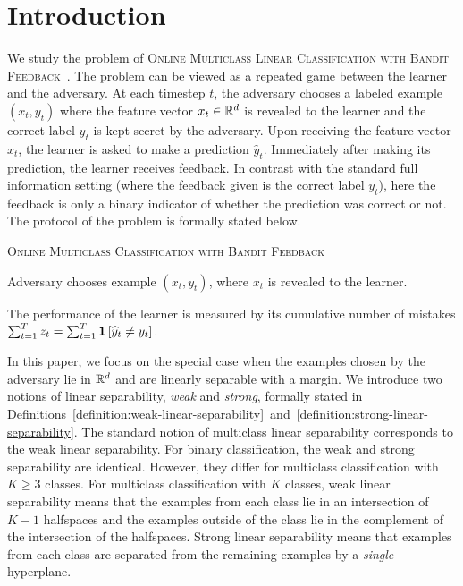 \section{Introduction}
\label{section:introduction}

We study the problem of \textsc{Online Multiclass Linear Classification with
Bandit Feedback}~\citep{Kakade-Shalev-Shwartz-Tewari-2008}. The problem can be
viewed as a repeated game between the learner and the adversary. At each
timestep $t$, the adversary chooses a labeled example $(x_t, y_t)$ where the
feature vector $x_t \in \mathbb{R}^d$ is revealed to the learner and the correct label
$y_t$ is kept secret by the adversary. Upon receiving the feature vector $x_t$,
the learner is asked to make a prediction $\widehat{y}_t$. Immediately after
making its prediction, the learner receives feedback. In contrast with the
standard full information setting (where the feedback given is the correct label
$y_t$), here the feedback is only a binary indicator of whether the prediction
was correct or not. The protocol of the problem is formally stated below.

\begin{protocol}[h]
\caption{\textsc{Online Multiclass Classification with Bandit Feedback}
\label{algorithm:game-protocol}}
\begin{algorithmic}[1]
{
\STATE Adversary chooses example $(x_t, y_t)$, where $x_t$ is revealed to the learner.
\ENDFOR
}
\end{algorithmic}
\end{protocol}

The performance of the learner is measured by its cumulative number of
mistakes $\sum_{t=1}^T z_t = \sum_{t=1}^T \mathbf{1}\left[\widehat y_t \neq y_t \right]$.

In this paper, we focus on the special case when the examples chosen by the
adversary lie in $\mathbb{R}^d$ and are linearly separable with a margin. We introduce
two notions of linear separability, \emph{weak} and \emph{strong}, formally
stated in
Definitions~\ref{definition:weak-linear-separability}~and~\ref{definition:strong-linear-separability}.
The standard notion of multiclass linear separability corresponds to the weak
linear separability. For binary classification, the weak and strong separability
are identical. However, they differ for multiclass classification with $K \ge 3$
classes. For multiclass classification with $K$ classes, weak linear
separability means that the examples from each class lie in an intersection of
$K-1$ halfspaces and the examples outside of the class lie in the complement of
the intersection of the halfspaces. Strong linear separability means that
examples from each class are separated from the remaining examples by a
\emph{single} hyperplane.

